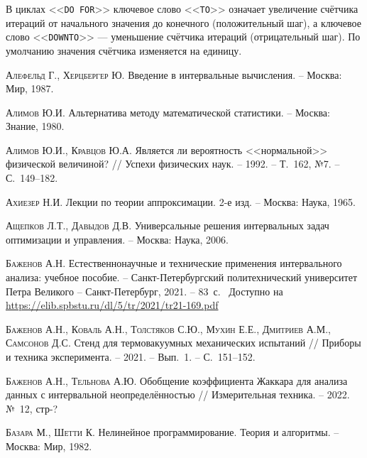 \documentclass[a5paper,openany]{book}
\begin{document}
В циклах <<\texttt{DO FOR}>> ключевое слово <<\texttt{TO}>> означает увеличение 
счётчика итераций от начального значения до конечного (положительный шаг), 
а ключевое слово <<\texttt{DOWNTO}>> --- уменьшение счётчика итераций 
(отрицательный шаг). По умолчанию значения счётчика изменяется на единицу. 
  
   
\begin{thebibliography}{999}
\small\parskip=0mm 
  
\textsc{Алефельд Г., Херцбергер Ю.} Введение в интервальные вычисления. 
-- Москва: Мир, 1987. 
  
\textsc{Алимов Ю.И.} Альтернатива методу математической статистики. 
-- Москва: Знание, 1980. 
  
\textsc{Алимов Ю.И., Кравцов Ю.А.} Является ли вероятность <<нормальной>> физической 
величиной? // Успехи физических наук. -- 1992. -- Т.~162, №7. -- С.~149--182. 
  
\textsc{Ахиезер Н.И.} Лекции по теории аппроксимации. 2-е изд. -- Москва: Наука, 1965. 
  
\textsc{Ащепков Л.Т., Давыдов Д.В.} Универсальные решения интервальных задач оптимизации 
и управления. -- Москва: Наука, 2006. 
  
\textsc{Баженов А.Н.} Естественнонаучные и технические применения интервального 
анализа: учебное пособие. -- Санкт-Петербургский политехнический университет 
Петра Великого -- Санкт-Петербург, 2021. -- 83~с. \  Доступно 
на \url{https://elib.spbstu.ru/dl/5/tr/2021/tr21-169.pdf} 
  
\textsc{Баженов А.Н., Коваль А.Н., Толстяков С.Ю., Мухин Е.Е., Дмитриев А.М., 
Самсонов Д.С.} Стенд для термовакуумных механических испытаний // Приборы и техника 
эксперимента. -- 2021. -- Вып.~1. -- С.~151--152. 
  
\textsc{Баженов А.Н., Тельнова А.Ю.}
Обобщение коэффициента Жаккара для анализа данных с интервальной неопределённостью //
Измерительная техника. -- 2022. №~12, стр-?
  
\textsc{Базара М., Шетти К.} Нелинейное программирование. Теория и алгоритмы. 
-- Москва: Мир, 1982. 
  

\end{thebibliography}
\end{document}
